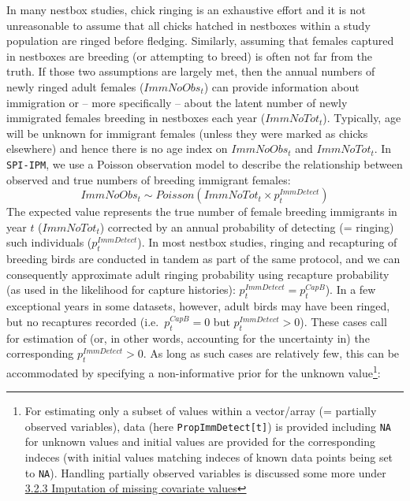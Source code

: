 \documentclass[
]{book}
\begin{document}
In many nestbox studies, chick ringing is an exhaustive effort and it is not unreasonable to assume that all chicks hatched in nestboxes within a study population are ringed before fledging. Similarly, assuming that females captured in nestboxes are breeding (or attempting to breed) is often not far from the truth. If those two assumptions are largely met, then the annual numbers of newly ringed adult females (\(ImmNoObs_t\)) can provide information about immigration or -- more specifically -- about the latent number of newly immigrated females breeding in nestboxes each year (\(ImmNoTot_t\)). Typically, age will be unknown for immigrant females (unless they were marked as chicks elsewhere) and hence there is no age index on \(ImmNoObs_t\) and \(ImmNoTot_t\). In \texttt{SPI-IPM}, we use a Poisson observation model to describe the relationship between observed and true numbers of breeding immigrant females:
\begin{equation}
  ImmNoObs_t \sim Poisson(ImmNoTot_t \times p_t^{ImmDetect})
\end{equation}
The expected value represents the true number of female breeding immigrants in year \(t\) (\(ImmNoTot_t\)) corrected by an annual probability of detecting (= ringing) such individuals (\(p_t^{ImmDetect}\)). In most nestbox studies, ringing and recapturing of breeding birds are conducted in tandem as part of the same protocol, and we can consequently approximate adult ringing probability using recapture probability (as used in the likelihood for capture histories): \(p_t^{ImmDetect} = p_t^{CapB}\)). In a few exceptional years in some datasets, however, adult birds may have been ringed, but no recaptures recorded (i.e.~\(p_t^{CapB}=0\) but \(p_t^{ImmDetect}>0\)). These cases call for estimation of (or, in other words, accounting for the uncertainty in) the corresponding \(p_t^{ImmDetect}>0\). As long as such cases are relatively few, this can be accommodated by specifying a non-informative prior for the unknown value\footnote{For estimating only a subset of values within a vector/array (= partially observed variables), data (here \texttt{PropImmDetect{[}t{]}}) is provided including \texttt{NA} for unknown values and initial values are provided for the corresponding indeces (with initial values matching indeces of known data points being set to \texttt{NA}). Handling partially observed variables is discussed some more under \protect\hyperlink{ux5cux23ux5cux23ux5cux2520Imputationux5cux2520ofux5cux2520missingux5cux2520covariateux5cux2520values}{3.2.3 Imputation of missing covariate values}}:
\end{document}
